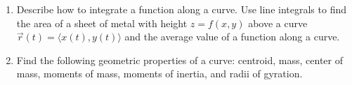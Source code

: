 
\begin{enumerate}
\item Describe how to integrate a function along a curve. Use line
  integrals to find the area of a sheet of metal with height
  $z=f(x,y)$ above a curve $\vec r(t)=\langle x(t),y(t)\rangle$ and the average
  value of a function along a curve.
\item Find the following geometric properties of a curve: centroid,
  mass, center of mass, moments of mass, moments of inertia, and radii
  of gyration.
\end{enumerate}


